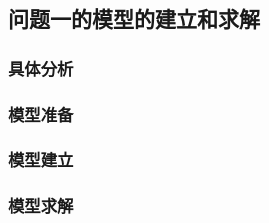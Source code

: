 \subsection{问题一的模型的建立和求解}

\subsubsection{具体分析}

\subsubsection{模型准备}

\subsubsection{模型建立}

\subsubsection{模型求解}
